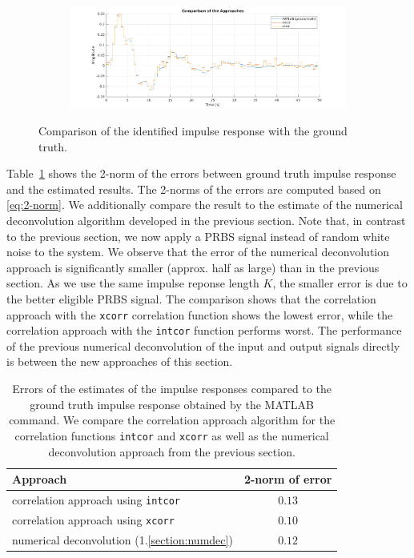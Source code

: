 \documentclass{scrartcl}
\begin{document}
\begin{figure}[h!]
\begin{subfigure}{\textwidth}
		\includegraphics[width=\textwidth]{figures/impulse_response_comparison.pdf}
		\label{fig:impulse_response_comparison}
	\end{subfigure}
	\caption{Comparison of the identified impulse response with the ground truth.}\label{fig:correlation_impulse_responses}
\end{figure}

\pagebreak
Table~\ref{tab:correlation_appraoch_errors} shows the 2-norm of the errors between ground truth impulse response and the estimated results.
The 2-norms of the errors are computed based on \eqref{eq:2-norm}.
We additionally compare the result to the estimate of the numerical deconvolution algorithm developed in the previous section.
Note that, in contrast to the previous section, we now apply a PRBS signal instead of random white noise to the system.
We observe that the error of the numerical deconvolution approach is significantly smaller (approx. half as large) than in the previous section. 
As we use the same impulse reponse length $K$, the smaller error is due to the better eligible PRBS signal.
The comparison shows that the correlation approach with the \texttt{xcorr} correlation function shows the lowest error, while the correlation approach with the \texttt{intcor} function performs worst.
The performance of the previous numerical deconvolution of the input and output signals directly is between the new approaches of this section.
\begin{table}[h]
	\centering
	\begin{tabular}{l|c}
	\hline
	\hline
	\textbf{Approach} & \textbf{2-norm of error}\\
	\hline
		correlation approach using \texttt{intcor} & $0.13$ \\
		correlation approach using \texttt{xcorr} & $0.10$ \\\hline
		numerical deconvolution (1.\ref{section:numdec}) & $0.12$\\
	\hline
	\hline
	\end{tabular}
	\caption{Errors of the estimates of the impulse responses compared to the ground truth impulse response obtained by the MATLAB command. We compare the correlation approach algorithm for the correlation functions \texttt{intcor} and \texttt{xcorr} as well as the numerical deconvolution approach from the previous section.}
	\label{tab:correlation_appraoch_errors}
\end{table}
\end{document}
